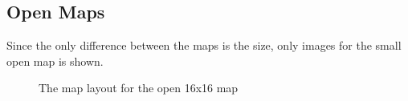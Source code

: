 \documentclass[runningheads]{llncs}
\begin{document}
\subsection{Open Maps}
Since the only difference between the maps is the size, only images for the small open map is shown.
\begin{figure}[H]
\caption{The map layout for the open 16x16 map}
\end{figure}
\end{document}
